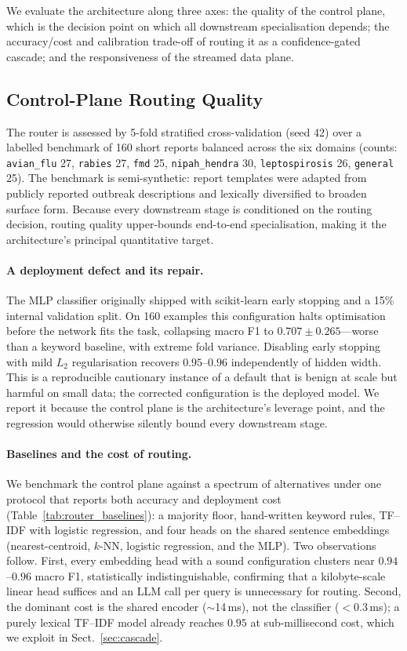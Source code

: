 \documentclass[runningheads]{llncs}
\begin{document}
We evaluate the architecture along three axes: the quality of the control plane, which is the decision point on which all downstream specialisation depends; the accuracy/cost and calibration trade-off of routing it as a confidence-gated cascade; and the responsiveness of the streamed data plane.

\subsection{Control-Plane Routing Quality}

The router is assessed by 5-fold stratified cross-validation (seed 42) over a labelled benchmark of 160 short reports balanced across the six domains (counts: \texttt{avian\_flu} 27, \texttt{rabies} 27, \texttt{fmd} 25, \texttt{nipah\_hendra} 30, \texttt{leptospirosis} 26, \texttt{general} 25). The benchmark is semi-synthetic: report templates were adapted from publicly reported outbreak descriptions and lexically diversified to broaden surface form. Because every downstream stage is conditioned on the routing decision, routing quality upper-bounds end-to-end specialisation, making it the architecture's principal quantitative target.

\paragraph{A deployment defect and its repair.}
The MLP classifier originally shipped with scikit-learn early stopping and a 15\% internal validation split. On 160 examples this configuration halts optimisation before the network fits the task, collapsing macro F1 to $0.707\pm0.265$---worse than a keyword baseline, with extreme fold variance. Disabling early stopping with mild $L_2$ regularisation recovers $0.95$--$0.96$ independently of hidden width. This is a reproducible cautionary instance of a default that is benign at scale but harmful on small data; the corrected configuration is the deployed model. We report it because the control plane is the architecture's leverage point, and the regression would otherwise silently bound every downstream stage.

\paragraph{Baselines and the cost of routing.}
We benchmark the control plane against a spectrum of alternatives under one protocol that reports both accuracy and deployment cost (Table~\ref{tab:router_baselines}): a majority floor, hand-written keyword rules, TF--IDF with logistic regression, and four heads on the shared sentence embeddings (nearest-centroid, $k$-NN, logistic regression, and the MLP). Two observations follow. First, every embedding head with a sound configuration clusters near $0.94$--$0.96$ macro F1, statistically indistinguishable, confirming that a kilobyte-scale linear head suffices and an LLM call per query is unnecessary for routing. Second, the dominant cost is the shared encoder ($\sim$14\,ms), not the classifier ($<0.3$\,ms); a purely lexical TF--IDF model already reaches $0.95$ at sub-millisecond cost, which we exploit in Sect.~\ref{sec:cascade}.
\end{document}

